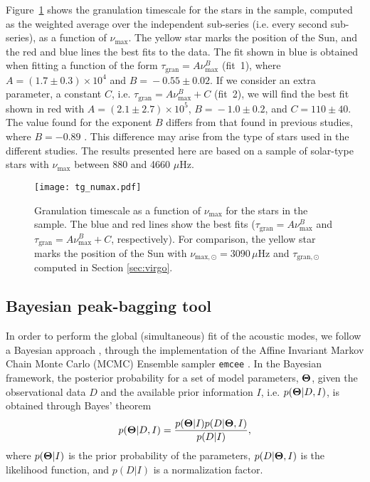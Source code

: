 \documentclass[twocolumn]{aastex61}%
\begin{document}
Figure~\ref{fig:tgnumax} shows the granulation timescale for the stars in the sample, computed as the weighted average over the independent sub-series (i.e. every second sub-series), as a function of $\nu_\text{max}$. The yellow star marks the position of the Sun, and the red and blue lines the best fits to the data. The fit shown in blue is obtained when fitting a function of the form $\tau_\text{gran}=A\nu_\text{max}^B$ (fit~1), where $A=(1.7\pm0.3)\!\times\!10^4$ and $B\!=\!-0.55\pm0.02$. If we consider an extra parameter, a constant $C$, i.e. $\tau_\text{gran}=A\nu_\text{max}^B+C$ (fit~2),
we will find the best fit shown in red with $A=(2.1\pm2.7)\!\times\!10^5$, $B\!=\!-1.0\pm0.2$, and $C\!\!=\!110\pm40$. The value found for the exponent $B$ differs from that found in previous studies, where $B=-0.89$ \citep{Mathur2011,Kallinger2014}. This difference may arise from the type of stars used in the different studies. The results presented here are based on a sample of solar-type stars with $\nu_\text{max}$ between 880 and 4660 $\mu\text{Hz}$.

\begin{figure}[h!]
\texttt{[image: tg\_numax.pdf]}\vspace{-0.1cm}
\caption{Granulation timescale as a function of $\nu_\text{max}$ for the stars in the sample. The blue and red lines show the best fits ($\tau_\text{gran}=A\nu_\text{max}^B$ and $\tau_\text{gran}=A\nu_\text{max}^B+C$, respectively). For comparison, the yellow star marks the position of the Sun with $\nu_{\text{max},\odot}=3090\,\mu \text{Hz}$ \citep[e.g.][]{Huber2011} and $\tau_{\text{gran},\odot}$ computed in Section \ref{sec:virgo}.}\label{fig:tgnumax}
\end{figure}

\subsection{Bayesian peak-bagging tool}\label{sec:peakbag}

In order to perform the global (simultaneous) fit of the acoustic modes, we follow a Bayesian approach \citep[e.g.][]{Benomar2009,Campante2011,Handberg2011,Davies2016,Lund2017}, through the implementation of the Affine Invariant Markov Chain Monte Carlo (MCMC) Ensemble sampler \texttt{emcee} \citep[][]{Goodman2010,Foreman-Mackey2013}.
In the Bayesian framework, the posterior probability for a set of model parameters, $\bf\Theta$, given the observational data $D$ and the available prior information $I$, i.e. $p({\bf\Theta}|D,I)$, is obtained through Bayes' theorem\vspace{-0.2cm}
\begin{equation}
p({\bf\Theta}|D,I)=\dfrac{p({\bf\Theta}|I)p(D|{\bf\Theta},I)}{p(D|I)},
\end{equation}
where $p({\bf\Theta}|I)$ is the prior probability of the parameters, $p(D|{\bf\Theta},I)$ is the likelihood function, and $p(D|I)$ is a normalization factor.
\end{document}
